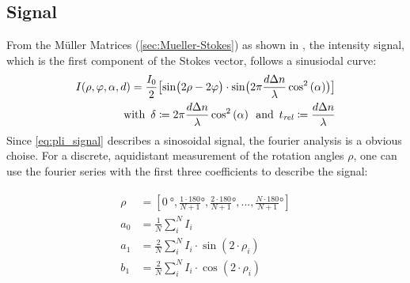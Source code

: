 \subsection{Signal}
% 
From the M\"{u}ller Matrices (\cref{sec:Mueller-Stokes}) as shown in \cite{MenzelMaster,MenzelDissertation}, the intensity signal, which is the first component of the Stokes vector, follows a sinusiodal curve:
% 
\begin{align}
\label{eq:pli_signal}
\begin{split}
I(\rho, \varphi, \alpha, d) =\frac{I_0}{2}\bigl[ \sin\bigl(2\rho - 2\varphi \bigr)\cdot \sin \bigl( 2\pi\frac{d \textnormal{$\Delta n$}}{\lambda} \cos^2\left( \alpha \right) \bigr) \bigr] \\
\text{with} \enspace \delta \coloneqq 2\pi\frac{d \textnormal{$\Delta n$}}{\lambda} \cos^2\left( \alpha \right) \enspace 
\text{and} \enspace \textnormal{$t_\mathit{rel}$} \coloneqq \frac{d \textnormal{$\Delta n$}}{\lambda}
\end{split}
\end{align}
% 
Since \cref{eq:pli_signal} describes a sinosoidal signal, the fourier analysis is a obvious choise.
For a discrete, aquidistant measurement of the rotation angles $\rho$, one can use the fourier series with the first three coefficients to describe the signal:
% 

\begin{align}
\begin{split}
\rho &= [\SI{0}{\degree}, \frac{1\cdot180}{N+1}\si{\degree}, \frac{2\cdot180}{N+1}\si{\degree}, ..., \frac{N\cdot180}{N+1}\si{\degree}]\\
a_0 &= \frac{1}{N} \sum_i^N I_i\\
a_1 &= \frac{2}{N} \sum_i^N I_i \cdot \sin(2 \cdot \rho_i)\\
b_1 &= \frac{2}{N} \sum_i^N I_i \cdot \cos(2 \cdot \rho_i)
\end{split}
\end{align}


